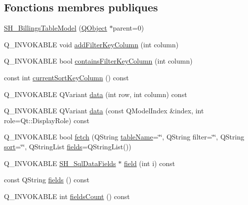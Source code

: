 \subsection*{Fonctions membres publiques}
\begin{DoxyCompactItemize}
\item 
\hyperlink{classSH__BillingsTableModel_a96183b1dd581519136c9b3932607f3d0}{S\-H\-\_\-\-Billings\-Table\-Model} (\hyperlink{classQObject}{Q\-Object} $\ast$parent=0)
\item 
Q\-\_\-\-I\-N\-V\-O\-K\-A\-B\-L\-E void \hyperlink{classSH__ExtendedProxyModel_a7b432fac5c42bf84a005f2942896ca32}{add\-Filter\-Key\-Column} (int column)
\item 
Q\-\_\-\-I\-N\-V\-O\-K\-A\-B\-L\-E bool \hyperlink{classSH__ExtendedProxyModel_a81c40d3ce9710029cae19cc65bf5419d}{contains\-Filter\-Key\-Column} (int column)
\item 
const int \hyperlink{classSH__ExtendedProxyModel_adbbc1e62c72991f4ed14537cf1ba9c8f}{current\-Sort\-Key\-Column} () const 
\item 
Q\-\_\-\-I\-N\-V\-O\-K\-A\-B\-L\-E Q\-Variant \hyperlink{classSH__ExtendedProxyModel_aca6cc510f740e847e0cfc06e0adb5771}{data} (int row, int column) const 
\item 
Q\-\_\-\-I\-N\-V\-O\-K\-A\-B\-L\-E Q\-Variant \hyperlink{classSH__ExtendedProxyModel_afbc947efbe1107fc5bf8926c52902a1c}{data} (const Q\-Model\-Index \&index, int role=Qt\-::\-Display\-Role) const 
\item 
Q\-\_\-\-I\-N\-V\-O\-K\-A\-B\-L\-E bool \hyperlink{classSH__ExtendedProxyModel_a1df5323af8d29e81f22a7118227eeeb8}{fetch} (Q\-String \hyperlink{classSH__ExtendedProxyModel_abb133e196ca7cf90b9c9b57263e898d6}{table\-Name}=\char`\"{}\char`\"{}, Q\-String filter=\char`\"{}\char`\"{}, Q\-String \hyperlink{classSH__ExtendedProxyModel_a2d5fdb58bf67879e3f3130619b93104a}{sort}=\char`\"{}\char`\"{}, Q\-String\-List \hyperlink{classSH__ExtendedProxyModel_a3a69386b6070dacf320ef29e760816c1}{fields}=Q\-String\-List())
\item 
Q\-\_\-\-I\-N\-V\-O\-K\-A\-B\-L\-E \hyperlink{classSH__SqlDataFields}{S\-H\-\_\-\-Sql\-Data\-Fields} $\ast$ \hyperlink{classSH__ExtendedProxyModel_a75081819198741a532eefd5875a90678}{field} (int i) const 
\item 
const Q\-String \hyperlink{classSH__ExtendedProxyModel_a3a69386b6070dacf320ef29e760816c1}{fields} () const 
\item 
Q\-\_\-\-I\-N\-V\-O\-K\-A\-B\-L\-E int \hyperlink{classSH__ExtendedProxyModel_ab935cb0865fd2010ab35f1743adb8633}{fields\-Count} () const 

\end{DoxyCompactItemize}
